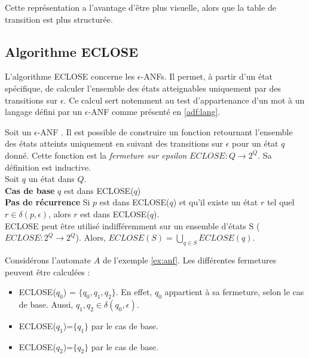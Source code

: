 Cette représentation a l'avantage d'être plus visuelle, alors que la table de transition est plus structurée.


\subsection{Algorithme ECLOSE}\label{adf:eclose}

L'algorithme ECLOSE concerne les $\epsilon$-ANFs. Il permet, à partir d'un état spécifique, de calculer l'ensemble des états atteignables uniquement par des transitions sur $\epsilon$. Ce calcul sert notemment au test d'appartenance d'un mot à un langage défini par un $\epsilon$-ANF comme présenté en \ref{adf:lang}.

Soit un $\epsilon$-ANF \automaton. Il est possible de construire un fonction retournant l'ensemble des états atteints uniquement en suivant des transitions sur $\epsilon$ pour un état $q$ donné. Cette fonction est la \emph{fermeture sur epsilon} $ECLOSE : Q \rightarrow 2^Q$. Sa définition est inductive.\\

Soit $q$ un état dans $Q$.\\
\textbf{Cas de base} $q$ est dans ECLOSE($q$)\\
\textbf{Pas de récurrence} Si $p$ est dans ECLOSE($q$) et qu'il existe un état $r$ tel quel $r\in\delta(p,\epsilon)$, alors $r$ est dans ECLOSE($q$).\\

ECLOSE peut être utilisé indifféremment sur un ensemble d'états S ($ECLOSE : 2^Q \rightarrow 2^Q$). Alors, $ECLOSE(S)=\bigcup_{q\in S}ECLOSE(q)$.

\begin{example}[ECLOSE]\label{ex:anfclosure} Considérons l'automate $A$ de l'exemple \ref{ex:anf}. Les différentes fermetures peuvent être calculées :
	\begin{itemize}
		\item ECLOSE($q_0$) = $\{q_0,q_1,q_2\}$. En effet, $q_0$ appartient à sa fermeture, selon le cas de base. Aussi, $q_1,q_2\in\delta(q_0, \epsilon)$.
		\item ECLOSE($q_1$)=$\{q_1\}$ par le cas de base.
		\item ECLOSE($q_2$)=$\{q_2\}$ par le cas de base.
	\end{itemize}
\end{example}



